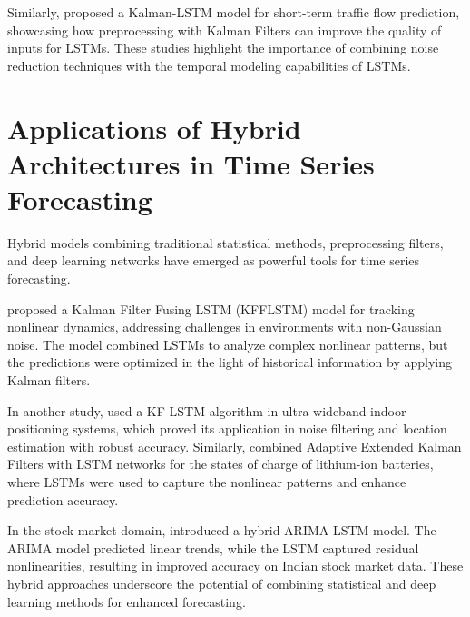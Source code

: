 Similarly, \textcite{fang_kalman-lstm_2021} proposed a Kalman-LSTM model for short-term traffic flow prediction, showcasing how preprocessing with Kalman Filters can improve the quality of inputs for LSTMs. These studies highlight the importance of combining noise reduction techniques with the temporal modeling capabilities of LSTMs.

\section{Applications of Hybrid Architectures in Time Series Forecasting}
Hybrid models combining traditional statistical methods, preprocessing filters, and deep learning networks have emerged as powerful tools for time series forecasting.  

\textcite{song_improved_2022} proposed a Kalman Filter Fusing LSTM (KFFLSTM) model for tracking nonlinear dynamics, addressing challenges in environments with non-Gaussian noise. The model combined LSTMs to analyze complex nonlinear patterns, but the predictions were optimized in the light of historical information by applying Kalman filters.  

In another study, \textcite{tian_application_2024} used a KF-LSTM algorithm in ultra-wideband indoor positioning systems, which proved its application in noise filtering and location estimation with robust accuracy. Similarly, \textcite{wang_hybrid_2024} combined Adaptive Extended Kalman Filters with LSTM networks for the states of charge of lithium-ion batteries, where LSTMs were used to capture the nonlinear patterns and enhance prediction accuracy. 

In the stock market domain, \textcite{sahni_neoteric_2022} introduced a hybrid ARIMA-LSTM model. The ARIMA model predicted linear trends, while the LSTM captured residual nonlinearities, resulting in improved accuracy on Indian stock market data. These hybrid approaches underscore the potential of combining statistical and deep learning methods for enhanced forecasting.  

